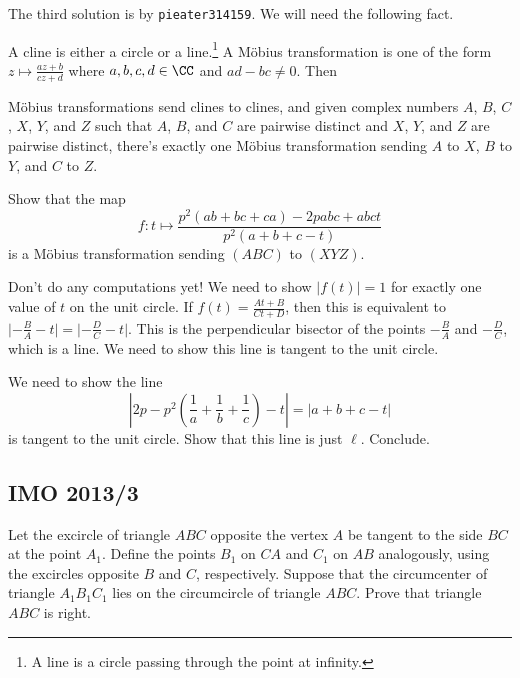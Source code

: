 \documentclass[11pt]{scrartcl}
\begin{document}
\begin{walkthrough}
	The third solution is by \texttt{pieater314159}. We will need the following fact.
	\begin{theorem*}
		A cline is either a circle or a line.\footnote{A line is a circle passing through the point at infinity.} A M\"obius transformation is one of the form $z \mapsto \frac{az + b}{cz + d}$ where $a,b,c,d \in \CC$ and $ad - bc \neq 0$. Then
		\begin{itemize}
			\ii M\"obius transformations send clines to clines, and
			\ii given complex numbers $A$, $B$, $C$, $X$, $Y$, and $Z$ such that $A$, $B$, and $C$ are pairwise distinct and $X$, $Y$, and $Z$ are pairwise distinct, there's exactly one M\"obius transformation sending $A$ to $X$, $B$ to $Y$, and $C$ to $Z$.
		\end{itemize}
	\end{theorem*}
	\begin{walk}[resume]
		\ii Show that the map
		\[f: t \mapsto \frac{p^2(ab + bc + ca) - 2pabc + abct}{p^2(a + b + c - t)}\]
		is a M\"obius transformation sending $(ABC)$ to $(XYZ)$.
	\end{walk}
	Don't do any computations yet! We need to show $\lvert f(t)\rvert = 1$ for exactly one value of $t$ on the unit circle. If $f(t) = \frac{At + B}{Ct + D}$, then this is equivalent to $\lvert -\frac BA - t\rvert = \lvert -\frac DC - t\rvert$. This is the perpendicular bisector of the points $-\frac BA$ and $-\frac DC$, which is a line. We need to show this line is tangent to the unit circle.
	\begin{walk}[resume]
		\ii We need to show the line
		\[\left\lvert 2p - p^2\left( \frac 1a + \frac 1b + \frac 1c \right) - t\right\rvert = \lvert a + b + c - t\rvert\]
		is tangent to the unit circle. Show that this line is just $\ell$. Conclude.
	\end{walk}
\end{walkthrough}

\pagebreak

\subsection{IMO 2013/3}

\begin{example}[IMO 2013/3]
    Let the excircle of triangle $ABC$ opposite the vertex $A$ be tangent to the side $BC$ at the point $A_1$. Define the points $B_1$ on $CA$ and $C_1$ on $AB$ analogously, using the excircles opposite $B$ and $C$, respectively. Suppose that the circumcenter of triangle $A_1B_1C_1$ lies on the circumcircle of triangle $ABC$. Prove that triangle $ABC$ is right.
\end{example}
\end{document}
